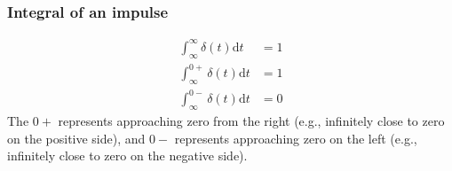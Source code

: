 \documentclass[10pt]{article}
\begin{document}
\subsubsection*{Integral of an impulse}
\begin{align*}
    \int_{\infty}^\infty \delta(t) \text{d}t &= 1\\
    \int_{\infty}^{0+} \delta(t) \text{d}t &= 1\\
    \int_{\infty}^{0-} \delta(t) \text{d}t &= 0
\end{align*}
The $0+$ represents approaching zero from the right (e.g., infinitely close to zero on the positive side), and $0-$ represents approaching zero on the left (e.g., infinitely close to zero on the negative side).
\end{document}
